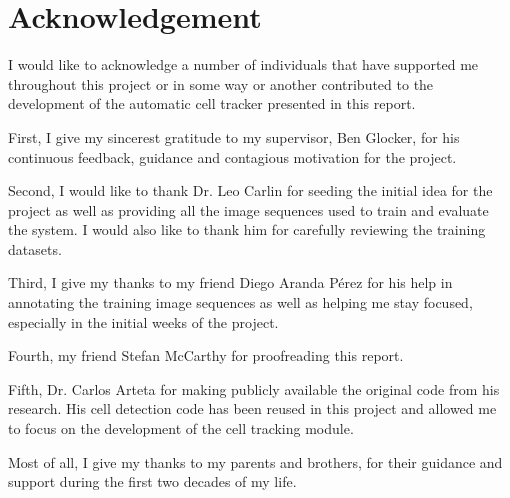 \chapter*{Acknowledgement}

I would like to acknowledge a number of individuals that have supported me throughout this project or in some way or another contributed to the development of the automatic cell tracker presented in this report.

First, I give my sincerest gratitude to my supervisor, Ben Glocker, for his continuous feedback, guidance and contagious motivation for the project. 

Second, I would like to thank Dr. Leo Carlin for seeding the initial idea for the project as well as providing all the image sequences used to train and evaluate the system. I would also like to thank him for carefully reviewing the training datasets.

Third, I give my thanks to my friend Diego Aranda Pérez for his help in annotating the training image sequences as well as helping me stay focused, especially in the initial weeks of the project.

Fourth, my friend Stefan McCarthy for proofreading this report.

Fifth, Dr. Carlos Arteta for making publicly available the original code from his research. His cell detection code has been reused in this project and allowed me to focus on the development of the cell tracking module.

Most of all, I give my thanks to my parents and brothers, for their guidance and support during the first two decades of my life.